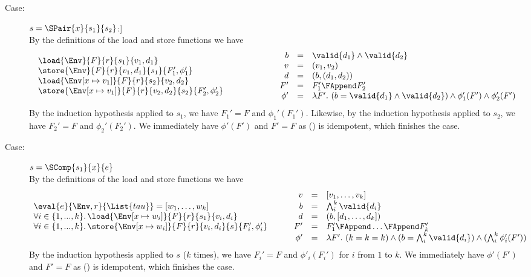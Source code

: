 {\begin{description}
\item[Case:]$s = \SPair{x}{s_1}{s_2}$:]\\[1ex]
%
By the definitions of the load and store functions we have 
\[ 
\begin{array}{l}
\load{\Env}{F}{r}{s_1}{v_1,d_1}\\
\store{\Env}{F}{r}{v_1,d_1}{s_1}{F_1',\phi_1'}\\
\load{\Env[x \mapsto v_1]}{F}{r}{s_2}{v_2,d_2}\\
\store{\Env[x \mapsto v_1]}{F}{r}{v_2,d_2}{s_2}{F_2',\phi_2'}\\
\end{array} \hspace*{2cm}
\begin{array}{rcl}
b &= & \valid{d_1} \wedge \valid{d_2}\\
v &=& (v_1,v_2)\\
d &=& (b,(d_1,d_2))\\
F' &=& F_1' \FAppend F_2'\\
\phi' &=& \lambda F'.~(b = \valid{d_1} \wedge \valid{d_2}) \wedge \phi_1'(F') \wedge \phi_2'(F')\\
\end{array}
\]
By the induction hypothesis applied to $s_1$, we have $F_1' = F$ and
$\phi_1'(F_1')$. Likewise, by the induction hypothesis applied to
$s_2$, we have $F_2' = F$ and $\phi_2'(F_2')$. We immediately have
$\phi'(F')$ and $F' = F$ as (\FAppend) is idempotent, which finishes
the case.

\item[Case:] $s = \SComp{s_1}{x}{e}$\\[1ex]
%
By the definitions of the load and store functions we have 
\[ 
\begin{array}{l}
\eval{e}{\Env,r}{\List{tau}} = [w_1,\dots,w_k ]\\
\forall i \in \{1,...,k\}.\,\load{\Env[ x \mapsto w_i]}{F}{r}{s_1}{v_i,d_i}\\
\forall i \in \{1,...,k\}.\,\store{\Env[x \mapsto w_i]}{F}{r}{v_i,d_i}{s}{F_i',\phi_i'}\\
\end{array}\hspace*{.75cm}\begin{array}{rcl}
v &=& [v_1,\dots,v_k]\\
b &= &\bigwedge_i^k \valid{d_i}\\
d &=& (b,[d_1,\dots,d_k])\\
F' &=& F_1' \FAppend \dots \FAppend F_k'\\
\phi' &=& \lambda F'.~(k = k = k) \wedge (b = \bigwedge_i^k \valid{d_i}) \wedge (\bigwedge_i^k \phi_i'(F'))\\
\end{array}
\]
By the induction hypothesis applied to $s$ ($k$ times), we have $F_i'
= F$ and $\phi'_i(F_i')$ for $i$ from $1$ to $k$. We immediately have
$\phi'(F')$ and $F' = F$ as (\FAppend) is idempotent, which finishes
the case.


\end{description}}

